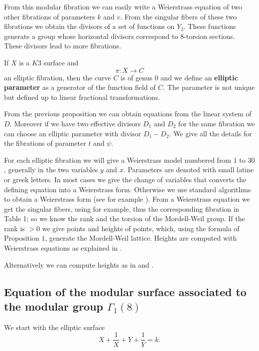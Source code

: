 \documentclass{amsart}
\begin{document}
 From this modular fibration we can  easily write a Weierstrass equation of two other  fibrations of parameters $k$ and $v$. From the singular fibers of these two fibrations we obtain the divisors of a set of functions on $Y_2$. These
functions generate a group whose horizontal divisors correspond to $8$-torsion
sections. These divisors lead to more fibrations.
 
 
If $X$ is a $K3$ surface and 
\[
\pi : X \rightarrow C
\]
an elliptic fibration, then the curve $C$ is of genus $0$ and we define an \textbf  {elliptic parameter} as a generator of the function field of $C.$ The parameter is not unique but defined up to  linear fractional transformations. 

From the previous proposition  we can obtain equations from the linear system of $D$.
Moreover if we have two effective divisors $D_{1}$ and $D_{2}$ for the same
fibration we can choose an elliptic parameter with divisor $D_{1}-D_{2}.$ We
give all the details for the fibrations of parameter $t$ and $\psi.$

For each elliptic fibration we will give a Weierstrass model numbered from $1$ to $30$, generally in the two variables $y$ and $x$. Parameters are denoted with small latine or greek letters. In most cases we give the change of variables that converts the defining equation into a Weierstrass form.
 Otherwise we use standard algorithms to obtain a Weierstrass form (see for example
\cite{Ca}). From a Weierstrass equation we get the singular fibers, using \cite{T} for example,  thus  the corresponding fibration in Table 1; so we know the rank and the torsion of the Mordell-Weil group. 
If the rank is $>0$ we give points and heights of points, which, using the formula of Proposition $1$,
generate the Mordell-Weil lattice. Heights are computed with Weierstrass equations as explained in \cite{Ku}.  
 
Alternatively we can compute heights as in \cite{Shio} and \cite{HL}.


\subsection{Equation of the modular surface associated to the modular group $\Gamma_{1}(8)$}


We start with the elliptic surface
\[
X+\frac {1}{X}+Y+\frac {1}{Y}=k.
\]
\end{document}
